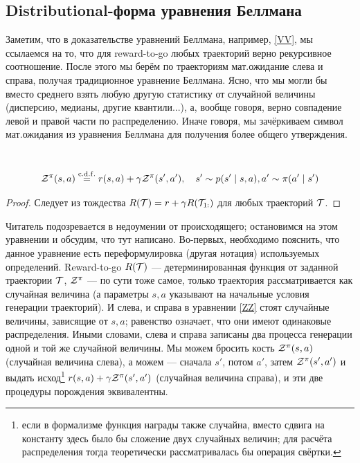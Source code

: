 \subsection{Distributional-форма уравнения Беллмана}

Заметим, что в доказательстве уравнений Беллмана, например, \eqref{VV}, мы ссылаемся на то, что для reward-to-go любых траекторий верно рекурсивное соотношение. После этого мы берём по траекториям мат.ожидание слева и справа, получая традиционное уравнение Беллмана. Ясно, что мы могли бы вместо среднего взять любую другую статистику от случайной величины (дисперсию, медианы, другие квантили...), а, вообще говоря, верно совпадение левой и правой части по распределению. Иначе говоря, мы зачёркиваем символ мат.ожидания из уравнения Беллмана для получения более общего утверждения.

\begin{theorem}\,
\begin{equation}\label{ZZ}
 \mathcal{Z}^\pi(s, a) \mathrel{\stackrel{\mathrm{c.d.f.}}=} r(s, a) + \gamma \mathcal{Z}^\pi(s', a'), \quad s' \sim p(s' \mid s, a), a' \sim \pi(a' \mid s') 
\end{equation}
\begin{proof}
Следует из тождества $R(\mathcal{T}) = r + \gamma R(\mathcal{T}_{1:})$ для любых траекторий $\mathcal{T}$.
\end{proof}
\end{theorem}

Читатель подозревается в недоумении от происходящего; остановимся на этом уравнении и обсудим, что тут написано. Во-первых, необходимо пояснить, что данное уравнение есть переформулировка (другая нотация) используемых определений. Reward-to-go $R(\mathcal{T})$ --- детерминированная функция от заданной траектории $\mathcal{T}$, $\mathcal{Z}^\pi$ --- по сути тоже самое, только траектория рассматривается как случайная величина (а параметры $s, a$ указывают на начальные условия генерации траекторий). И слева, и справа в уравнении \eqref{ZZ} стоят случайные величины, зависящие от $s, a$; равенство означает, что они имеют одинаковые распределения. Иными словами, слева и справа записаны два процесса генерации одной и той же случайной величины. Мы можем бросить кость $\mathcal{Z}^\pi(s, a)$ (случайная величина слева), а можем --- сначала $s'$, потом $a'$, затем $\mathcal{Z}^\pi(s', a')$ и выдать исход\footnote{если в формализме функция награды также случайна, вместо сдвига на константу здесь было бы сложение двух случайных величин; для расчёта распределения тогда теоретически рассматривалась бы операция свёртки.} $r(s, a) \HM+ \gamma \Z^\pi(s', a')$ (случайная величина справа), и эти две процедуры порождения эквивалентны. 

